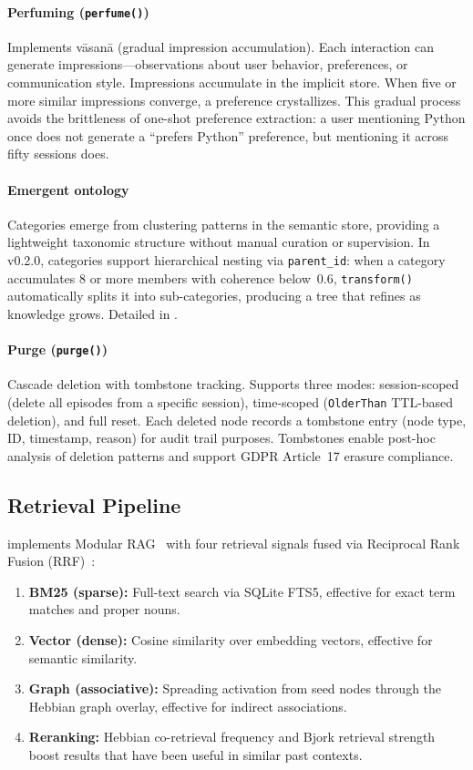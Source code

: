 \paragraph{Perfuming (\texttt{perfume()})}
Implements v\=asan\=a (gradual impression accumulation). Each interaction
can generate impressions---observations about user behavior, preferences,
or communication style. Impressions accumulate in the implicit store. When
five or more similar impressions converge, a preference crystallizes. This
gradual process avoids the brittleness of one-shot preference extraction:
a user mentioning Python once does not generate a ``prefers Python''
preference, but mentioning it across fifty sessions does.

\paragraph{Emergent ontology}
Categories emerge from clustering patterns in the semantic store, providing
a lightweight taxonomic structure without manual curation or supervision.
In v0.2.0, categories support hierarchical nesting via \texttt{parent\_id}:
when a category accumulates 8 or more members with coherence below~0.6,
\texttt{transform()} automatically splits it into sub-categories,
producing a tree that refines as knowledge grows.
Detailed in .

\paragraph{Purge (\texttt{purge()})}
Cascade deletion with tombstone tracking. Supports three modes:
session-scoped (delete all episodes from a specific session),
time-scoped (\texttt{OlderThan} TTL-based deletion), and full reset.
Each deleted node records a tombstone entry (node type, ID, timestamp,
reason) for audit trail purposes. Tombstones enable post-hoc analysis
of deletion patterns and support GDPR Article~17 erasure compliance.

\subsection{Retrieval Pipeline}
\label{sec:retrieval}

\alaya{} implements Modular RAG~\cite{gao2023rag} with four retrieval
signals fused via Reciprocal Rank Fusion (RRF)~\cite{cormack2009rrf}:

\begin{enumerate}[nosep]
    \item \textbf{BM25 (sparse):} Full-text search via SQLite FTS5,
    effective for exact term matches and proper nouns.
    \item \textbf{Vector (dense):} Cosine similarity over embedding
    vectors, effective for semantic similarity.
    \item \textbf{Graph (associative):} Spreading activation from seed
    nodes through the Hebbian graph overlay, effective for indirect
    associations.
    \item \textbf{Reranking:} Hebbian co-retrieval frequency and Bjork
    retrieval strength boost results that have been useful in similar past
    contexts.
\end{enumerate}

